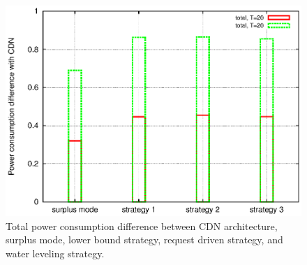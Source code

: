 \documentclass[JIP]{ipsj}
\begin{document}
\begin{figure}[ht]
\begin{minipage}[b]{0.3\linewidth}
	\includegraphics[scale=0.4]{graphs/diff-cdn.eps}
	\caption{Total power consumption difference between CDN architecture, surplus mode, lower bound strategy, request driven strategy, and water leveling strategy.}
	\label{fig:difftocdn}
\end{minipage}
\label{fig:diffstrategy}
\end{figure}
\end{document}
